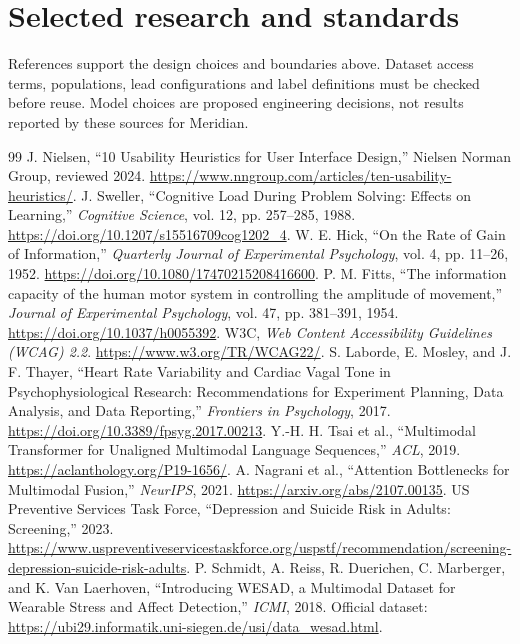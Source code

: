 \documentclass[11pt,a4paper]{article}
\begin{document}
\section{Selected research and standards}
References support the design choices and boundaries above. Dataset access terms, populations, lead configurations and label definitions must be checked before reuse. Model choices are proposed engineering decisions, not results reported by these sources for Meridian.
\begingroup
\small
\setlength{\parskip}{2pt}
\begin{thebibliography}{99}
 J. Nielsen, ``10 Usability Heuristics for User Interface Design,'' Nielsen Norman Group, reviewed 2024. \url{https://www.nngroup.com/articles/ten-usability-heuristics/}.
 J. Sweller, ``Cognitive Load During Problem Solving: Effects on Learning,'' \emph{Cognitive Science}, vol. 12, pp. 257--285, 1988. \url{https://doi.org/10.1207/s15516709cog1202_4}.
 W. E. Hick, ``On the Rate of Gain of Information,'' \emph{Quarterly Journal of Experimental Psychology}, vol. 4, pp. 11--26, 1952. \url{https://doi.org/10.1080/17470215208416600}.
 P. M. Fitts, ``The information capacity of the human motor system in controlling the amplitude of movement,'' \emph{Journal of Experimental Psychology}, vol. 47, pp. 381--391, 1954. \url{https://doi.org/10.1037/h0055392}.
 W3C, \emph{Web Content Accessibility Guidelines (WCAG) 2.2}. \url{https://www.w3.org/TR/WCAG22/}.
 S. Laborde, E. Mosley, and J. F. Thayer, ``Heart Rate Variability and Cardiac Vagal Tone in Psychophysiological Research: Recommendations for Experiment Planning, Data Analysis, and Data Reporting,'' \emph{Frontiers in Psychology}, 2017. \url{https://doi.org/10.3389/fpsyg.2017.00213}.
 Y.-H. H. Tsai et al., ``Multimodal Transformer for Unaligned Multimodal Language Sequences,'' \emph{ACL}, 2019. \url{https://aclanthology.org/P19-1656/}.
 A. Nagrani et al., ``Attention Bottlenecks for Multimodal Fusion,'' \emph{NeurIPS}, 2021. \url{https://arxiv.org/abs/2107.00135}.
 US Preventive Services Task Force, ``Depression and Suicide Risk in Adults: Screening,'' 2023. \url{https://www.uspreventiveservicestaskforce.org/uspstf/recommendation/screening-depression-suicide-risk-adults}.
 P. Schmidt, A. Reiss, R. Duerichen, C. Marberger, and K. Van Laerhoven, ``Introducing WESAD, a Multimodal Dataset for Wearable Stress and Affect Detection,'' \emph{ICMI}, 2018. Official dataset: \url{https://ubi29.informatik.uni-siegen.de/usi/data_wesad.html}.

\end{thebibliography}
\end{document}
